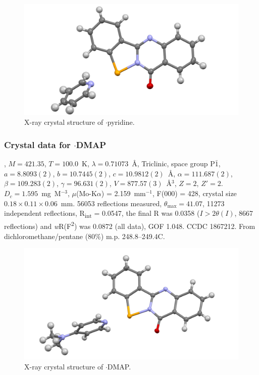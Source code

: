 \begin{refsection}
    \begin{figure}
      \includegraphics[width=0.6\linewidth]{Figures/tetracycle-py-xtal.pdf}
      \caption{X-ray crystal structure of \texorpdfstring{$ \cdot $pyridine}{C19H13N3OSe}.}
    \end{figure}
    
    \subsubsection{Crystal data for \texorpdfstring{$ \cdot $DMAP}{C21H18N4OSe}}
    , $M = 421.35$, $T=100.0$~K, $ \lambda=0.71073 $~\AA, Triclinic, space group P$\bar{1}$, $a = 8.8093(2)$, $b = 10.7445(2)$, $c = 10.9812(2)$~\AA, $\alpha = 111.687(2)$\degree, $\beta = 109.283(2)$\degree, $\gamma = 96.631(2)$\degree, $V = 877.57(3)$~\AA$^{3}$, $Z = 2$, $Z\prime = 2$.
    $D_{c}= 1.595$~mg~M$^{-3}$, $\mu$(Mo-K$\alpha$) = 2.159~mm$^{-1}$, F(000) = 428, crystal size $0.18 \times 0.11 \times 0.06$~mm.
    56053 reflections measured, $\theta_{\max} = 41.07$\degree, 11273 independent reflections, R\textsubscript{int} = 0.0547, the final R was 0.0358 ($I > 2\theta(I)$, 8667 reflections) and \textit{w}R(F\textsuperscript{2}) was 0.0872 (all data), GOF 1.048.
    CCDC 1867212.
    From dichloromethane/pentane (80\%) m.p. 248.8--249.4\degree{}C.
    
    \begin{figure}
      \includegraphics[width=0.6\linewidth]{Figures/tetracycle-dmap-xtal.pdf}
      \caption{X-ray crystal structure of \texorpdfstring{$ \cdot $DMAP}{C21H18N4OSe}.}
    \end{figure}
    
    \printbibliography[heading=subbibliography]
    \end{refsection}
    